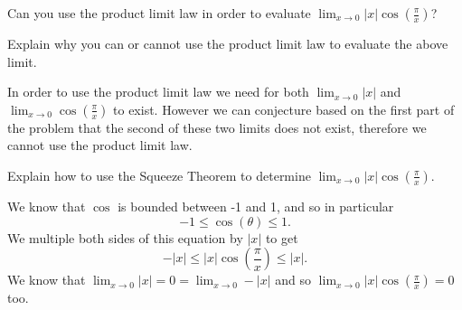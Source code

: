 \documentclass{ximera}
\begin{document}
\begin{exercise}
\begin{exercise}
\begin{exercise}

Can you use the product limit law in order to evaluate $\lim_{x\to0}\left|x\right|\cos\left(\frac{\pi}{x}\right)$?
\begin{multipleChoice}
\end{multipleChoice}

\begin{question}
Explain why you can or cannot use the product limit law to evaluate the above limit.
\begin{freeResponse}
In order to use the product limit law we need for both $\lim_{x\to0}\left|x\right|$ and $\lim_{x\to0}\cos\left(\frac{\pi}{x}\right)$ to exist.  However we can conjecture based on the first part of the problem that the second of these two limits does not exist, therefore we cannot use the product limit law.
\end{freeResponse}
\end{question}

\begin{exercise}

\begin{question}
Explain how to use the Squeeze Theorem to determine $\lim_{x\to0}\left|x\right|\cos\left(\frac{\pi}{x}\right)$.
\begin{freeResponse}
We know that $\cos$ is bounded between -1 and 1, and so in particular 
\[
-1\leq\cos\left(\theta\right)\leq1.
\]  
We multiple both sides of this equation by $\left|x\right|$ to get
\[
-\left|x\right|\leq\left|x\right|\cos\left(\frac{\pi}{x}\right)\leq\left|x\right|.
\]
We know that $\lim_{x\to0}\left|x\right| = 0 = \lim_{x\to0}-\left|x\right|$ and so $\lim_{x\to0}\left|x\right|\cos\left(\frac{\pi}{x}\right)=0$ too.
\end{freeResponse}
\end{question}

\end{exercise}
\end{exercise}
\end{exercise}
\end{exercise}
\end{document}
